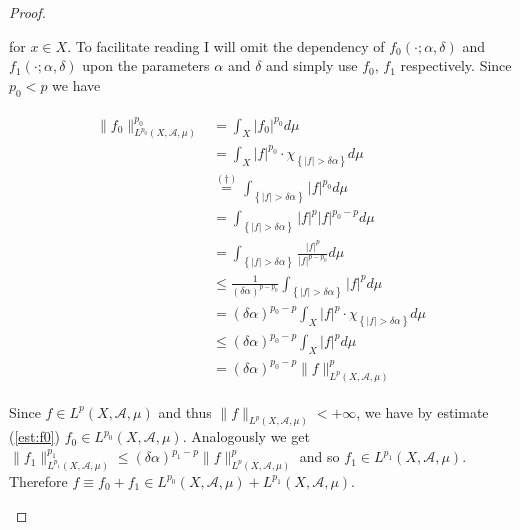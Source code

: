 \begin{proof}
\begin{enumerate}[label = \textbf{(\roman*.)}]
\begin{enumerate}[label = \textbf{\alph*.}]
	for $x \in X$. To facilitate reading I will omit the dependency of $f_0(\cdot;\alpha,\delta)$ and $f_1(\cdot;\alpha,\delta)$ upon the parameters $\alpha$ and $\delta$ and simply use $f_0$, $f_1$ respectively. Since $p_0 < p$ we have 

	\begin{gather}
		\begin{aligned}
			\|f_0\|^{p_0}_{L^{p_0}(X,\mathcal{A},\mu)} &= \int_{X} \vert f_0\vert^{p_0} d\mu\\
			&=\int_{X} \vert f \vert^{p_0} \cdot \chi_{\left\{\vert f\vert > \delta\alpha \right\}} d\mu\\
			&\overset{(\dagger)}{=} \int_{\left\{\vert f \vert > \delta\alpha \right\}} \vert f \vert^{p_0}d\mu\\ 
			&= \int_{\left\{\vert f\vert > \delta\alpha \right\}} \vert f \vert^p \vert f \vert^{p_0 - p} d\mu\\
			&= \int_{\left\{\vert f\vert > \delta\alpha \right\}} \frac{\vert f \vert^p}{\vert f \vert^{p - p_0}} d\mu\\
		& \leqslant \frac{1}{(\delta\alpha)^{p - p_0}} \int_{\left\{\vert f\vert > \delta\alpha \right\}} \vert f \vert^p d\mu\\
			&= (\delta\alpha)^{p_0 - p} \int_{X} \vert f \vert^p \cdot \chi_{\left\{\vert f\vert > \delta\alpha \right\}} d\mu\\
			& \leqslant (\delta\alpha)^{p_0 - p} \int_{X} \vert f \vert^p d\mu\\
			&= (\delta\alpha)^{p_0 - p} \|f\|^p_{L^p(X,\mathcal{A},\mu)}
		\end{aligned}
		\label{est:f0}
	\end{gather}

	Since $f \in L^p(X,\mathcal{A},\mu)$ and thus $\|f\|_{L^p(X,\mathcal{A},\mu)} < + \infty$, we have by estimate (\ref{est:f0}) $f_0 \in L^{p_0}(X,\mathcal{A},\mu)$. Analogously we get $\|f_1\|^{p_1}_{L^{p_1}(X,\mathcal{A},\mu)} \leqslant (\delta\alpha)^{p_1 - p}\|f\|_{L^p(X,\mathcal{A},\mu)}^p$ and so $f_1 \in L^{p_1}(X,\mathcal{A},\mu)$. Therefore $f \equiv f_0 + f_1 \in L^{p_0}(X,\mathcal{A},\mu) + L^{p_1}(X,\mathcal{A},\mu)$.\\
	

\end{enumerate}
\end{enumerate}
\end{proof}
